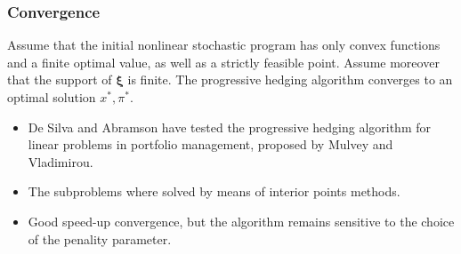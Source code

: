 \documentclass{beamer}
\def\bxi{\boldsymbol\xi}
\begin{document}
\begin{frame}
\frametitle{Convergence}

\begin{theorem}
Assume that the initial nonlinear stochastic program has only convex functions and a finite optimal value, as well as a strictly feasible point.
Assume moreover that the support of $\bxi$ is finite.
The progressive hedging algorithm converges to an optimal solution $x^*, \pi^*$.
\end{theorem}

\begin{itemize}
\item
De Silva and Abramson have tested the progressive hedging algorithm for linear problems in portfolio management, proposed by Mulvey and Vladimirou.
\item
The subproblems where solved by means of interior points methods.
\item
Good speed-up convergence, but the algorithm remains sensitive to the choice of the penality parameter.
\end{itemize}

\end{frame}
\end{document}

